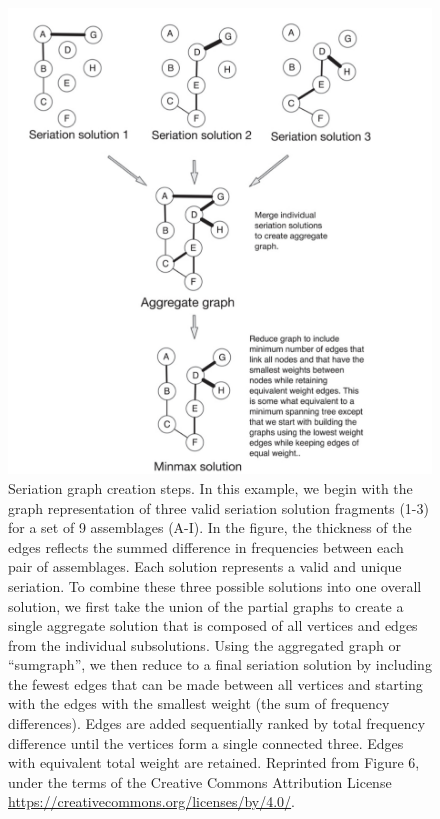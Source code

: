 \begin{figure}[p!]
  \centering
  \includegraphics[scale=0.4]{graphics/conclusion/lipo2015-figure6-minmax.pdf}
  \caption{Seriation graph creation steps.  In this example, we begin with the graph representation of three valid seriation solution fragments (1-3) for a set of 9 assemblages (A-I).  In the figure, the thickness of the edges reflects the summed difference in frequencies between each pair of assemblages.  Each solution represents a valid and unique seriation.  To combine these three possible solutions into one overall solution, we first take the union of the partial graphs to create a single aggregate solution that is composed of all vertices and edges from the individual subsolutions.  Using the aggregated graph or ``sumgraph'', we then reduce to a final seriation solution by including the fewest edges that can be made between all vertices and starting with the edges with the smallest weight (the sum of frequency differences).  Edges are added sequentially ranked by total frequency difference until the vertices form a single connected three.  Edges with equivalent total weight are retained.  Reprinted from Figure 6, \citep{Lipo2015} under the terms of the Creative Commons Attribution License \url{https://creativecommons.org/licenses/by/4.0/}.}
  \label{conc:fig:minmax-seriation}
\end{figure}

